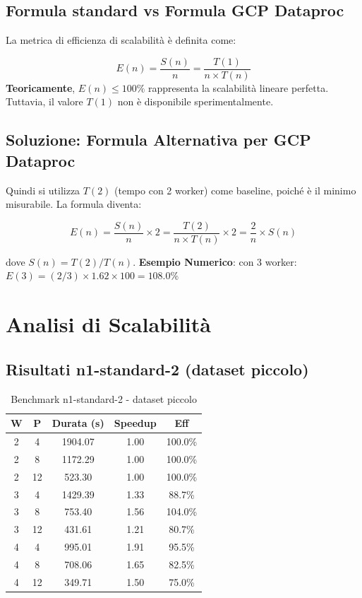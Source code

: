 \documentclass[8pt,a4paper]{article}
\begin{document}
\subsection{Formula standard vs Formula GCP Dataproc}

La metrica di efficienza di scalabilità è definita come:

\begin{equation}
E(n) = \frac{S(n)}{n} = \frac{T(1)}{n \times T(n)}
\end{equation}
\noindent
\textbf{Teoricamente}, $E(n) \leq 100\%$ rappresenta la scalabilità lineare perfetta. Tuttavia, il valore $T(1)$ non è disponibile sperimentalmente.

\subsection{Soluzione: Formula Alternativa per GCP Dataproc}

Quindi si utilizza $T(2)$ (tempo con 2 worker) come baseline, poiché è il minimo misurabile. La formula diventa:

\begin{equation}
E(n) = \frac{S(n)}{n} \times 2 = \frac{T(2)}{n \times T(n)} \times 2 = \frac{2}{n} \times S(n)
\end{equation}

dove $S(n) = T(2) / T(n)$.
\textbf{Esempio Numerico}: con 3 worker: $E(3) = (2/3) \times 1.62 \times 100 = 108.0\%$

\section{Analisi di Scalabilità}

\subsection{Risultati n1-standard-2 (dataset piccolo)}

\begin{table}[H]
\centering
\caption{Benchmark n1-standard-2 - dataset piccolo}
\label{tab:n1_results}
\footnotesize
\begin{tabular}{|c|c|c|c|c|}
\hline
\textbf{W} & \textbf{P} & \textbf{Durata (s)} & \textbf{Speedup} & \textbf{Eff} \\
\hline
2 & 4 & 1904.07 & 1.00 & 100.0\% \\
2 & 8 & 1172.29 & 1.00 & 100.0\% \\
2 & 12 & 523.30 & 1.00 & 100.0\% \\
\hline
3 & 4 & 1429.39 & 1.33 & 88.7\% \\
3 & 8 & 753.40 & 1.56 & 104.0\% \\
3 & 12 & 431.61 & 1.21 & 80.7\% \\
\hline
4 & 4 & 995.01 & 1.91 & 95.5\% \\
4 & 8 & 708.06 & 1.65 & 82.5\% \\
4 & 12 & 349.71 & 1.50 & 75.0\% \\
\hline
\end{tabular}
\end{table}
\end{document}

